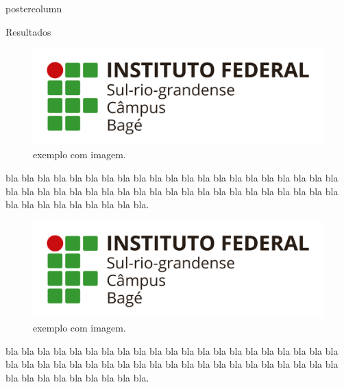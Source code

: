 \documentclass{beamer}
\newlength{\columnheight}
\begin{document}
\begin{frame}
\begin{columns}
\begin{column}{.49 \textwidth}
\begin{beamercolorbox}[center, wd= \textwidth]{postercolumn}
\begin{minipage}[T]{.95 \textwidth}
\parbox[t][\columnheight]{\textwidth}{
\begin{block}{{\Large Resultados}}
\justifying
{\large
\begin{figure}[h]
\begin{center}
\includegraphics[scale=0.5]{ifsul.png}
\caption{ exemplo com imagem.}
\end{center}
\end{figure}
bla bla bla bla bla bla bla bla bla bla bla bla bla bla bla bla bla bla bla bla bla bla bla bla bla bla bla bla bla bla bla bla bla bla bla bla bla bla bla bla bla bla bla bla bla bla bla bla bla bla bla.

\begin{figure}[h]
\begin{center}
\includegraphics[scale=0.5]{ifsul.png}
\caption{ exemplo com imagem.}
\end{center}
\end{figure}
bla bla bla bla bla bla bla bla bla bla bla bla bla bla bla bla bla bla bla bla bla bla bla bla bla bla bla bla bla bla bla bla bla bla bla bla bla bla bla bla bla bla bla bla bla bla bla bla bla bla bla.
}
\end{block}
\vspace{2cm}

}
\end{minipage}
\end{beamercolorbox}
\end{column}
\end{columns}
\end{frame}
\end{document}
